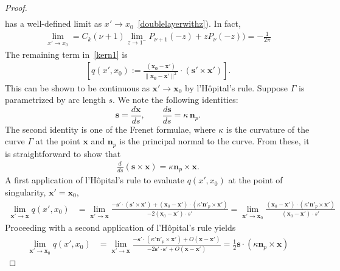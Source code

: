 \documentclass[final]{siamltex}
\newcommand{\C}{C_k}
\newcommand{\s}{s}
\begin{document}
\begin{proof}
\begin{align*}
\end{align*}
has a well-defined limit as $x'\rightarrow
x_0$~\eqref{doublelayerwithz}). In fact,
\begin{align*}
\lim_{x'\rightarrow x_0}=\C(\nu+1)\lim_{z\rightarrow 1^-}P_{\nu+1}(-z)+zP_{\nu}(-z))=-\frac{1}{2\pi}
\end{align*}
The remaining term in~\eqref{kern1} is 
\begin{align*}
  \left[q(x',x_0) := 
    \frac{(\mathbf{x_0}-\mathbf{x'})}{\|\mathbf{x_0}-\mathbf{x'}\|^2}
    \cdot \left( \mathbf{s}' \times {\mathbf x}' \right)\right].
\end{align*}
This can be shown to be continuous as ${\mathbf x}' \rightarrow {\mathbf x_0}$ by l'H\^{o}pital's rule. Suppose $\Gamma$ is parametrized by arc length $s$.  We note the following identities:
\[
   {\mathbf s} = \frac{d{\mathbf x}}{ds}, \qquad \frac{d{\mathbf s}}{ds} = \kappa \, {\mathbf n}_p .
\]
The second identity is one of the Frenet formulae, where $\kappa$ is the curvature of the curve $\Gamma$ at the point ${\mathbf x}$ and ${\mathbf n}_p$ is the principal normal to the curve. 
From these, it is straightforward to show that 
\begin{align*}
  \frac{d \, }{ds} \left( {\mathbf s} \times {\mathbf x} \right)=
  \kappa {\mathbf n}_p \times {\mathbf x} . 
\end{align*}
A first application of l'H\^{o}pital's rule to evaluate $q(x',x_0)$ at the point of singularity, ${\mathbf x}' = {\mathbf x_0}$, 
\begin{align*}
   \lim_{{\mathbf x}' \rightarrow {\mathbf x}}q(x',x_0) 
      & = \lim_{{\mathbf x}' \rightarrow {\mathbf x}}  \frac{ -\mathbf{s}' \cdot \left( \mathbf{s}' \times {\mathbf x}' \right) 
                                                             + ({\mathbf x_0}-{\mathbf x}') \cdot \left( \kappa' {\mathbf n}'_p \times {\mathbf x}'  \right)}
                                                           { -2 ({\mathbf x_0} - {\mathbf x}') \cdot \s' } =  \lim_{{\mathbf x}' \rightarrow {\mathbf x_0}}  \frac{  ({\mathbf x_0}-{\mathbf x}') \cdot \left( \kappa' {\mathbf n}'_p \times {\mathbf x}'  \right)}
                                                           { ({\mathbf x_0} - {\mathbf x}') \cdot \s' } 
\end{align*}
Proceeding with a second application of l'H\^{o}pital's rule yields
\begin{align*}
   \lim_{{\mathbf x}' \rightarrow {\mathbf x_0}} q(x',x_0)  
      & =   \lim_{{\mathbf x}' \rightarrow {\mathbf x}}  \frac{  -\mathbf{s'} \cdot 
                                                                 \left( \kappa' {\mathbf n}'_p \times {\mathbf x}'  \right) + O({\mathbf x}-{\mathbf x}')}
                                                           { -2{\mathbf s}' \cdot \mathbf{s}' + O({\mathbf x}-{\mathbf x}')}  = \frac{1}{2} \mathbf{s} \cdot  \left( \kappa {\mathbf n}_p \times {\mathbf x}  \right) 
\end{align*}
\end{proof}
\end{document}
